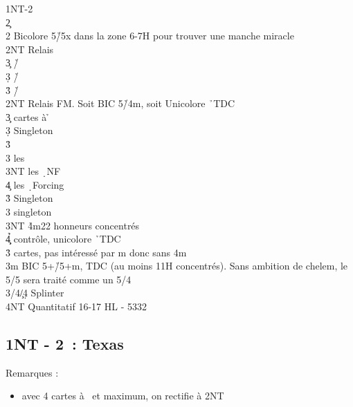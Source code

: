 \documentclass[a4paper]{article}
\begin{document}
\begin{bidtable}
1NT-2\d\\
2\c\+\\
2\s \> Bicolore 5\h /5x dans la zone 6-7H pour trouver une manche miracle\+\\
2NT \> Relais\+\\
3\c \> \h /\c \\
3\d \> \h /\d \\
3\h \> \h /\s \-\-\\
2NT \> Relais FM. Soit BIC 5\h /4m, soit Unicolore \h\ TDC\+\\
3\c {} cartes à \h \+\\
3\d \> Singleton \s \+\\
3\h\+\\
3\s \> les \c \\
3NT \> les \d\ NF\\
4\c \> les \d\ Forcing\-\-\\
3\h \> Singleton \c \\
3\s \> singleton \d \\
3NT \h 4m22 honneurs concentrés\\
4\c\d\h \> contrôle, unicolore \h\ TDC\-\\
3\h {} cartes, pas intéressé par m donc sans 4m\-\\
3m \> BIC 5+\h /5+m, TDC (au moins 11H concentrés). Sans ambition de chelem, le 5/5 sera traité comme un 5/4\\
3\s/4\c/4\d \> Splinter\\
4NT \> Quantitatif 16-17 HL - 5332\-
\end{bidtable}

\subsection{1NT - 2\pdfh\ : Texas \pdfs}

Remarques :

\begin{itemize}
\item avec 4 cartes à \s\ et maximum, on rectifie à 2NT

\end{itemize}
\end{document}
